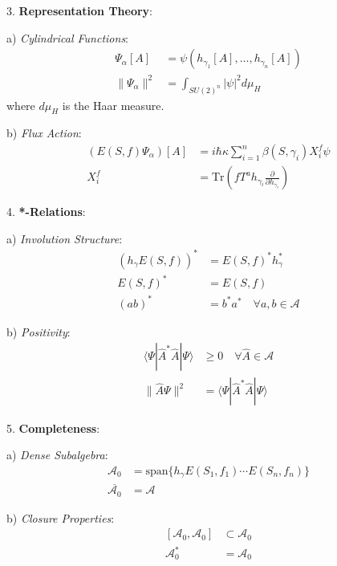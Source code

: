 \documentclass[12pt,a4paper]{article}
\begin{document}
3. \textbf{Representation Theory}:
   
   a) \textit{Cylindrical Functions}:
      \[
      \begin{aligned}
      \Psi_\alpha[A] &= \psi(h_{\gamma_1}[A],\ldots,h_{\gamma_n}[A]) \\
      \|\Psi_\alpha\|^2 &= \int_{SU(2)^n} |\psi|^2 d\mu_H
      \end{aligned}
      \]
      where $d\mu_H$ is the Haar measure.
   
   b) \textit{Flux Action}:
      \[
      \begin{aligned}
      (E(S,f)\Psi_\alpha)[A] &= i\hbar\kappa\sum_{i=1}^n \beta(S,\gamma_i)X^f_i\psi \\
      X^f_i &= \text{Tr}(fT^ah_{\gamma_i}\frac{\partial}{\partial h_{\gamma_i}})
      \end{aligned}
      \]

4. \textbf{*-Relations}:
   
   a) \textit{Involution Structure}:
      \[
      \begin{aligned}
      (h_\gamma E(S,f))^* &= E(S,f)^* h_\gamma^* \\
      E(S,f)^* &= E(S,f) \\
      (ab)^* &= b^*a^* \quad \forall a,b \in \mathcal{A}
      \end{aligned}
      \]
   
   b) \textit{Positivity}:
      \[
      \begin{aligned}
      \langle\Psi|\hat{A}^*\hat{A}|\Psi\rangle &\geq 0 \quad \forall \hat{A} \in \mathcal{A} \\
      \|\hat{A}\Psi\|^2 &= \langle\Psi|\hat{A}^*\hat{A}|\Psi\rangle
      \end{aligned}
      \]

5. \textbf{Completeness}:
   
   a) \textit{Dense Subalgebra}:
      \[
      \begin{aligned}
      \mathcal{A}_0 &= \text{span}\{h_\gamma E(S_1,f_1)\cdots E(S_n,f_n)\} \\
      \overline{\mathcal{A}_0} &= \mathcal{A}
      \end{aligned}
      \]
   
   b) \textit{Closure Properties}:
      \[
      \begin{aligned}
      [\mathcal{A}_0, \mathcal{A}_0] &\subset \mathcal{A}_0 \\
      \mathcal{A}_0^* &= \mathcal{A}_0
      \end{aligned}
      \]
\end{document}

